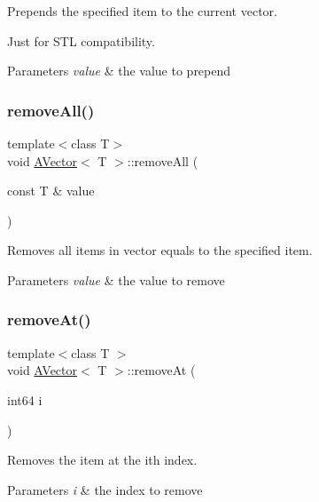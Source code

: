 Prepends the specified item to the current vector. 

Just for S\+TL compatibility.


\begin{DoxyParams}{Parameters}
{\em value} & the value to prepend \\
\hline
\end{DoxyParams}
\mbox{\label{class_a_vector_a521f435b2b3c74c92d6cbe94bc3faddd}} 
\subsubsection{\texorpdfstring{removeAll()}{removeAll()}}
{\footnotesize\ttfamily template$<$class T$>$ \\
void \mbox{\hyperlink{class_a_vector}{A\+Vector}}$<$ T $>$\+::remove\+All (\begin{DoxyParamCaption}\item[{const T \&}]{value }\end{DoxyParamCaption})}



Removes all items in vector equals to the specified item. 


\begin{DoxyParams}{Parameters}
{\em value} & the value to remove \\
\hline
\end{DoxyParams}
\mbox{\label{class_a_vector_a8da18d4cbfe89150ebecec53e2a6f73e}} 
\subsubsection{\texorpdfstring{removeAt()}{removeAt()}}
{\footnotesize\ttfamily template$<$class T $>$ \\
void \mbox{\hyperlink{class_a_vector}{A\+Vector}}$<$ T $>$\+::remove\+At (\begin{DoxyParamCaption}\item[{int64}]{i }\end{DoxyParamCaption})}



Removes the item at the ith index. 


\begin{DoxyParams}{Parameters}
{\em i} & the index to remove \\
\hline
\end{DoxyParams}
\mbox{\label{class_a_vector_a33f1e98af680a5c9e430dc11beeb4dd8}} 
